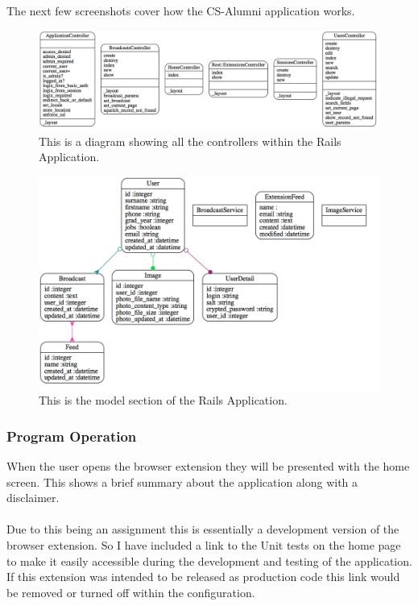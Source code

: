 \documentclass{article}
\begin{document}
\newpage
The next few screenshots cover how the CS-Alumni application works.

\begin{figure}[H]
\centering
\includegraphics[width=\textwidth]{controller}
\caption{This is a diagram showing all the controllers within the Rails Application.}
\end{figure}

\begin{figure}[H]
\centering
\includegraphics[width=\textwidth]{model}
\caption{This is the model section of the Rails Application.}
\end{figure}



\newpage
\subsubsection{Program Operation}

When the user opens the browser extension they will be presented with the home screen. This shows a brief summary about the application along with a disclaimer.\\
\\
Due to this being an assignment this is essentially a development version of the browser extension. So I have included a link to the Unit tests on the home page to make it easily accessible during the development and testing of the application. If this extension was intended to be released as production code this link would be removed or turned off within the configuration.\\
\end{document}
